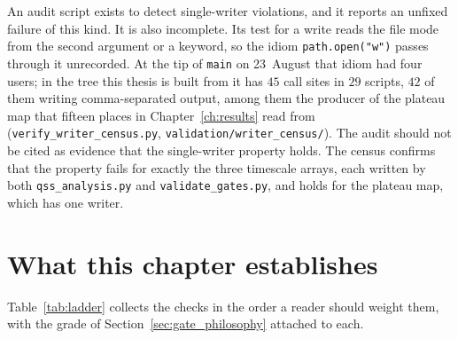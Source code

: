 An audit script exists to detect single-writer violations, and it reports an
unfixed failure of this kind. It is also incomplete. Its test for a write reads the file mode from the second
argument or a keyword, so the idiom \texttt{path.open("w")} passes through it
unrecorded. At the tip of \texttt{main} on 23~August that idiom had four users;
in the tree this thesis is built
from it has $45$ call sites in $29$ scripts, $42$ of them writing
comma-separated output, among them the producer of the plateau map that
fifteen places in Chapter~\ref{ch:results} read from
(\texttt{verify\_writer\_census.py}, \texttt{validation/writer\_census/}). The
audit should not be cited as evidence that the single-writer property holds.
The census confirms that the property fails for exactly the three timescale
arrays, each written by both \texttt{qss\_analysis.py} and
\texttt{validate\_gates.py}, and holds for the plateau map, which has one
writer.

\section{What this chapter establishes}
\label{sec:validation_summary}

Table~\ref{tab:ladder} collects the checks in the order a reader should weight
them, with the grade of Section~\ref{sec:gate_philosophy} attached to each.

